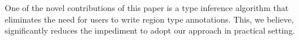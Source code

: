 One of the novel contributions of this paper is a type inference algorithm
that eliminates the need for users to write region type annotations.
This, we believe, significantly reduces the impediment to adopt our
approach in practical setting.






